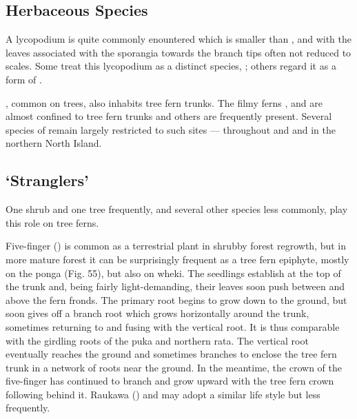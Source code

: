 \subsection{Herbaceous Species}

A lycopodium is quite commonly enountered which is smaller than , and with the leaves associated with the sporangia towards the branch tips often not reduced to scales.
Some treat this lycopodium as a distinct species, ; others regard it as a form of .

, common on trees, also inhabits tree fern trunks.
The filmy ferns ,  and  are almost confined to tree fern trunks and others are frequently present.
Several species of  remain largely restricted to such sites ---  throughout and  and  in the northern North Island.

\subsection{`Stranglers'}

One shrub and one tree frequently, and several other species less commonly, play this role on tree ferns.

Five-finger () is common as a terrestrial plant in shrubby forest regrowth, but in more mature forest it can be surprisingly frequent as a tree fern epiphyte, mostly on the ponga (Fig. 55), but also on wheki.
The seedlings establish at the top of the trunk and, being fairly light-demanding, their leaves soon push between and above the fern fronds.
The primary root begins to grow down to the ground, but soon gives off a branch root which grows horizontally around the trunk, sometimes returning to and fusing with the vertical root.
It is thus comparable with the girdling roots of the puka and northern rata.
The vertical root eventually reaches the ground and sometimes branches to enclose the tree fern trunk in a network of roots near the ground.
In the meantime, the crown of the five-finger has continued to branch and grow upward with the tree fern crown following behind it.
Raukawa () and  may adopt a similar life style but less frequently.

